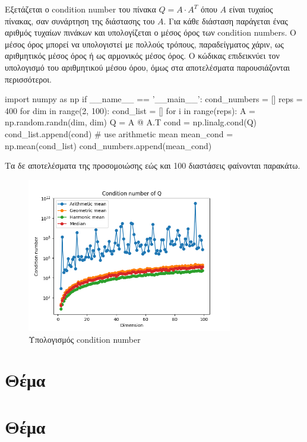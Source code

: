 \documentclass{article}
\newcommand{\eng}[1]{\foreignlanguage{english}{#1}} %
\begin{document}
Εξετάζεται ο \eng{condition number} του πίνακα $Q = A \cdot A^T$ όπου $A$ είναι
τυχαίος πίνακας, σαν συνάρτηση της διάστασης του $A$. Για κάθε διάσταση
παράγεται ένας αριθμός τυχαίων πινάκων και υπολογίζεται ο μέσος όρος των
\eng{condition numbers}. Ο μέσος όρος μπορεί να υπολογιστεί με πολλούς τρόπους,
παραδείγματος χάριν, ως αριθμητικός μέσος όρος ή ως αρμονικός μέσος όρος. Ο
κώδικας επιδεικνύει τον υπολογισμό του αριθμητικού μέσου όρου, όμως στα
αποτελέσματα παρουσιάζονται περισσότεροι.

\begin{python}
import numpy as np
if __name__ == '__main__':
    cond_numbers = []
    reps = 400
    for dim in range(2, 100):
        cond_list = []
        for i in range(reps):
            A = np.random.randn(dim, dim)
            Q = A @ A.T
            cond = np.linalg.cond(Q)
            cond_list.append(cond)
        # use arithmetic mean
        mean_cond = np.mean(cond_list)
        cond_numbers.append(mean_cond)
\end{python}

Τα δε αποτελέσματα της προσομοιώσης εώς και 100 διαστάσεις φαίνονται παρακάτω.

\begin{figure}[h]
    \centering
    \includegraphics[width=0.8\textwidth]{part1/condition_number_vs_dims.png}
    \caption{Υπολογισμός \eng{condition number}}
\end{figure}

\clearpage
\section{Θέμα}

\clearpage
\section{Θέμα}
\end{document}
